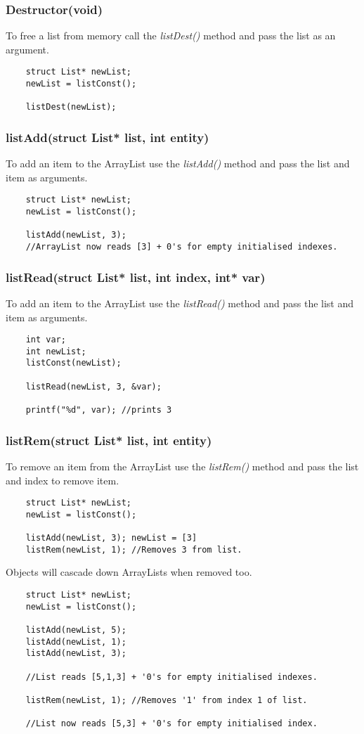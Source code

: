 \documentclass{article}
\begin{document}
\subsubsection*{Destructor(void)}
To free a list from memory call the \emph{listDest()} method and pass the list as an argument.
\begin{lstlisting}
    struct List* newList;
    newList = listConst();

    listDest(newList);
\end{lstlisting}

\subsubsection*{listAdd(struct List* list, int entity)}
To add an item to the ArrayList use the \emph{listAdd()} method and pass the list and item as arguments.
\begin{lstlisting}
    struct List* newList;
    newList = listConst();

    listAdd(newList, 3);
    //ArrayList now reads [3] + 0's for empty initialised indexes.
\end{lstlisting}

\subsubsection*{listRead(struct List* list, int index, int* var)}
To add an item to the ArrayList use the \emph{listRead()} method and pass the list and item as arguments.
\begin{lstlisting}
    int var;
    int newList;
    listConst(newList);

    listRead(newList, 3, &var);

    printf("%d", var); //prints 3
\end{lstlisting}

\subsubsection*{listRem(struct List* list, int entity)}
To remove an item from the ArrayList use the \emph{listRem()} method and pass the list and index to remove item.
\begin{lstlisting}
    struct List* newList;
    newList = listConst();

    listAdd(newList, 3); newList = [3]
    listRem(newList, 1); //Removes 3 from list.
\end{lstlisting}
Objects will cascade down ArrayLists when removed too.
\begin{lstlisting}
    struct List* newList;
    newList = listConst();

    listAdd(newList, 5);
    listAdd(newList, 1);
    listAdd(newList, 3);

    //List reads [5,1,3] + '0's for empty initialised indexes.

    listRem(newList, 1); //Removes '1' from index 1 of list.

    //List now reads [5,3] + '0's for empty initialised index.
\end{lstlisting}
\end{document}
